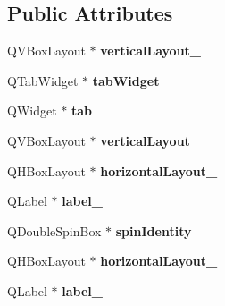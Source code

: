 \subsection*{Public Attributes}
\begin{DoxyCompactItemize}
\item 
Q\+V\+Box\+Layout $\ast$ {\bfseries vertical\+Layout\+\_}\hypertarget{class_ui___main_form_a06a797579dcf9aaca3c70c0a35c1559c}{}\label{class_ui___main_form_a06a797579dcf9aaca3c70c0a35c1559c}

\item 
Q\+Tab\+Widget $\ast$ {\bfseries tab\+Widget}\hypertarget{class_ui___main_form_a845ac6fea1cb3a3d3dfa5bc67ddd4263}{}\label{class_ui___main_form_a845ac6fea1cb3a3d3dfa5bc67ddd4263}

\item 
Q\+Widget $\ast$ {\bfseries tab}\hypertarget{class_ui___main_form_af01ae862b6f6061ad4ed211f72e235df}{}\label{class_ui___main_form_af01ae862b6f6061ad4ed211f72e235df}

\item 
Q\+V\+Box\+Layout $\ast$ {\bfseries vertical\+Layout}\hypertarget{class_ui___main_form_a5e14da3ca81145c355d9031c9abbace3}{}\label{class_ui___main_form_a5e14da3ca81145c355d9031c9abbace3}

\item 
Q\+H\+Box\+Layout $\ast$ {\bfseries horizontal\+Layout\+\_}\hypertarget{class_ui___main_form_a2e7958ad2620be5bbdb20b8dfd6aeeba}{}\label{class_ui___main_form_a2e7958ad2620be5bbdb20b8dfd6aeeba}

\item 
Q\+Label $\ast$ {\bfseries label\+\_}\hypertarget{class_ui___main_form_a519b1bbb5c90ee72e58d7f4efe722749}{}\label{class_ui___main_form_a519b1bbb5c90ee72e58d7f4efe722749}

\item 
Q\+Double\+Spin\+Box $\ast$ {\bfseries spin\+Identity}\hypertarget{class_ui___main_form_a9ef96b588b64d0d26f1e28636091bb0b}{}\label{class_ui___main_form_a9ef96b588b64d0d26f1e28636091bb0b}

\item 
Q\+H\+Box\+Layout $\ast$ {\bfseries horizontal\+Layout\+\_}\hypertarget{class_ui___main_form_ae7d38c14cd5361197461edc18f74bb26}{}\label{class_ui___main_form_ae7d38c14cd5361197461edc18f74bb26}

\item 
Q\+Label $\ast$ {\bfseries label\+\_}\hypertarget{class_ui___main_form_ac1ca806dd7711bd96324148fa410a98f}{}\label{class_ui___main_form_ac1ca806dd7711bd96324148fa410a98f}


\end{DoxyCompactItemize}
